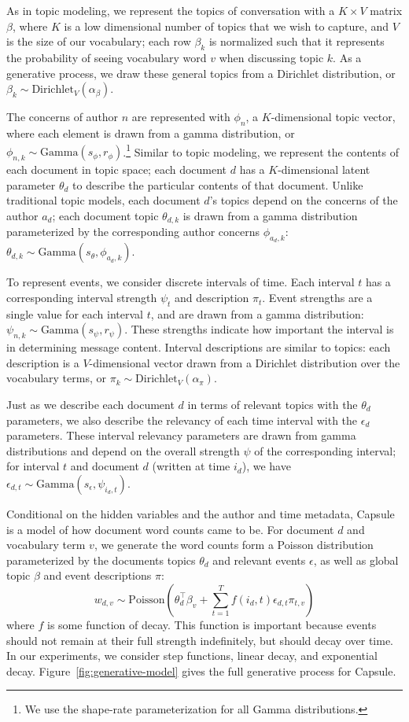 As in topic modeling, we represent the topics of conversation with a $K\times V$ matrix $\beta$, where $K$ is a low dimensional number of topics that we wish to capture, and $V$ is the size of our vocabulary; each row $\beta_k$ is normalized such that it represents the probability of seeing vocabulary word $v$ when discussing topic $k$.  As a generative process, we draw these general topics from a Dirichlet distribution, or $\beta_k \sim \mbox{Dirichlet}_V (\alpha_\beta).$ 

The concerns of author $n$ are represented with $\phi_n$, a $K$-dimensional topic vector, where each element is drawn from a gamma distribution, or $\phi_{n,k} \sim \mbox{Gamma}(s_\phi, r_\phi)$.\footnote{We use the shape-rate parameterization for all Gamma distributions.}  
Similar to topic modeling, we represent the contents of each document in topic space; each document $d$ has a $K$-dimensional latent parameter $\theta_d$ to describe the particular contents of that document.  Unlike traditional topic models, each document $d$'s topics depend on the concerns of the author $a_d$; each document topic $\theta_{d,k}$ is drawn from a gamma distribution parameterized by the corresponding author concerns $\phi_{a_d,k}$: $\theta_{d,k} \sim \mbox{Gamma}(s_\theta, \phi_{a_d,k})$.

To represent events, we consider discrete intervals of time.  Each interval $t$ has a corresponding interval strength $\psi_t$ and description $\pi_t$.  Event strengths are a single value for each interval $t$, and are drawn from a gamma distribution: $\psi_{n,k} \sim \mbox{Gamma}(s_\psi, r_\psi)$.  These strengths indicate how important the interval is in determining message content.  Interval descriptions are similar to topics: each description is a $V$-dimensional vector drawn from a Dirichlet distribution over the vocabulary terms, or $\pi_k \sim \mbox{Dirichlet}_V (\alpha_\pi).$

Just as we describe each document $d$ in terms of relevant topics with the $\theta_d$ parameters, we also describe the relevancy of each time interval with the $\epsilon_d$ parameters.  These interval relevancy parameters are drawn from gamma distributions and depend on the overall strength $\psi$ of the corresponding interval; for interval $t$ and document $d$ (written at time $i_d$), we have $\epsilon_{d,t} \sim \mbox{Gamma}(s_\epsilon, \psi_{i_d,t})$.

Conditional on the hidden variables and the author and time metadata, Capsule is a model of how document word counts came to be.  For document $d$ and vocabulary term $v$, we generate the word counts form a Poisson distribution parameterized by the documents topics $\theta_d$ and relevant events $\epsilon$, as well as global topic $\beta$ and event descriptions $\pi$:
\[w_{d,v} \sim \mbox{Poisson}\left(\theta_d^\top\beta_v + \sum_{t=1}^T f(i_d, t) \epsilon_{d,t} \pi_{t,v}\right)\] where $f$ is some function of decay.  This function is important because events should not remain at their full strength indefinitely, but should decay over time.  In our experiments, we consider step functions, linear decay, and exponential decay.  Figure~\ref{fig:generative-model} gives the full generative process for Capsule.


